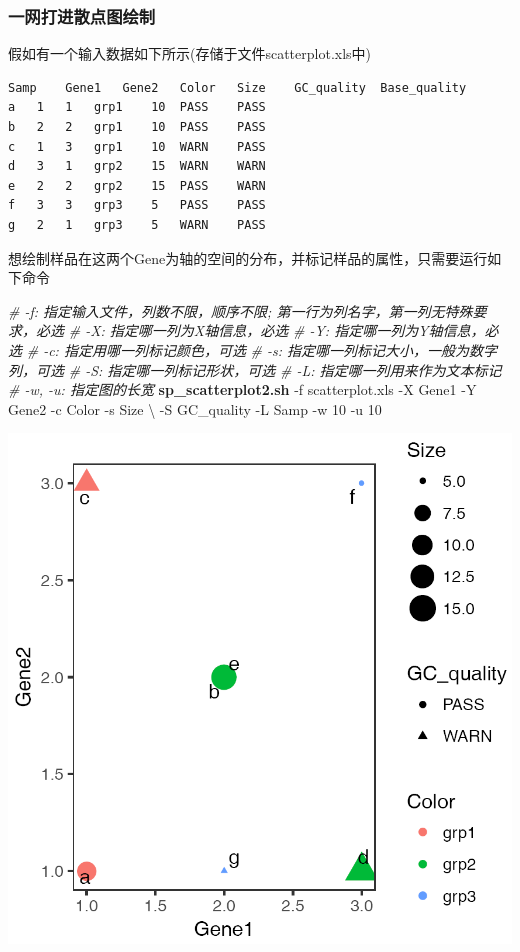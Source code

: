 \documentclass[]{article}
\newenvironment{Shaded}{\begin{snugshade}}{\end{snugshade}}
\newcommand{\KeywordTok}[1]{\textcolor[rgb]{0.13,0.29,0.53}{\textbf{{#1}}}}
\newcommand{\CommentTok}[1]{\textcolor[rgb]{0.56,0.35,0.01}{\textit{{#1}}}}
\newcommand{\NormalTok}[1]{{#1}}
\numberwithin{figure}{section}
\numberwithin{table}{section}
\theoremstyle{definition}
\theoremstyle{definition}
\theoremstyle{definition}
\theoremstyle{remark}
\begin{document}
\subsubsection{一网打进散点图绘制}

假如有一个输入数据如下所示(存储于文件scatterplot.xls中)

\begin{verbatim}
Samp    Gene1   Gene2   Color   Size    GC_quality  Base_quality
a   1   1   grp1    10  PASS    PASS
b   2   2   grp1    10  PASS    PASS
c   1   3   grp1    10  WARN    PASS
d   3   1   grp2    15  WARN    WARN
e   2   2   grp2    15  PASS    WARN
f   3   3   grp3    5   PASS    PASS
g   2   1   grp3    5   WARN    PASS
\end{verbatim}

想绘制样品在这两个Gene为轴的空间的分布，并标记样品的属性，只需要运行如下命令

\begin{Shaded}
\begin{Highlighting}[]
\CommentTok{# -f: 指定输入文件，列数不限，顺序不限; 第一行为列名字，第一列无特殊要求，必选}
\CommentTok{# -X: 指定哪一列为X轴信息，必选}
\CommentTok{# -Y: 指定哪一列为Y轴信息，必选}
\CommentTok{# -c: 指定用哪一列标记颜色，可选}
\CommentTok{# -s: 指定哪一列标记大小，一般为数字列，可选}
\CommentTok{# -S: 指定哪一列标记形状，可选}
\CommentTok{# -L: 指定哪一列用来作为文本标记}
\CommentTok{# -w, -u: 指定图的长宽}
\KeywordTok{sp_scatterplot2.sh} \NormalTok{-f scatterplot.xls -X Gene1 -Y Gene2 -c Color -s Size \textbackslash{}}
        \NormalTok{-S GC_quality -L Samp -w 10 -u 10}
\end{Highlighting}
\end{Shaded}

\begin{center}\includegraphics[width=0.95\linewidth,height=0.7\textheight,keepaspectratio]{images/scatterplot6} \end{center}
\end{document}
